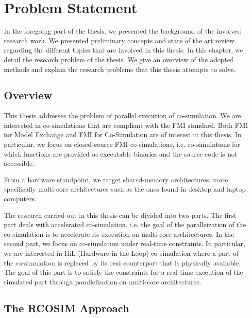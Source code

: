 \chapter{\label{ch:3-state}Problem Statement} 

\minitoc

In the foregoing part of the thesis, we presented the background of the involved research work. We presented preliminary concepts and state of the art review regarding the different topics that are involved in this thesis. In this chapter, we detail the research problem of the thesis. We give an overview of the adopted methods and explain the research problems that this thesis attempts to solve.

\section{Overview}

This thesis addresses the problem of parallel execution of co-simulation. We are interested in co-simulations that are compliant with the FMI standard. Both FMI for Model Exchange and FMI for Co-Simulation are of interest in this thesis. In particular, we focus on closed-source FMI co-simulations, i.e. co-simulations for which functions are provided as executable binaries and the source code is not accessible.

From a hardware standpoint, we target shared-memory architectures, more specifically multi-core architectures such as the ones found in desktop and laptop computers.

The research carried out in this thesis can be divided into two parts. The first part deals with accelerated co-simulation, i.e. the goal of the paralleization of the co-simulation is to accelerate its execution on multi-core architectures. In the second part, we focus on co-simulation under real-time constraints. In particular, we are interested in HiL (Hardware-in-the-Loop) co-simulation where a part of the co-simulation is replaced by its real counterpart that is physically available. 
The goal of this part is to satisfy the constraints for a real-time execution of the simulated part through parallelization on multi-core architectures.

\section{The RCOSIM Approach}

